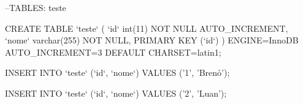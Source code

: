 --TABLES: teste

CREATE TABLE `teste` (
  `id` int(11) NOT NULL AUTO_INCREMENT,
  `nome` varchar(255) NOT NULL,
  PRIMARY KEY (`id`)
) ENGINE=InnoDB AUTO_INCREMENT=3 DEFAULT CHARSET=latin1;

INSERT INTO `teste` (`id`, `nome`) VALUES ('1', 'Breno\r\n');

INSERT INTO `teste` (`id`, `nome`) VALUES ('2', 'Luan');



